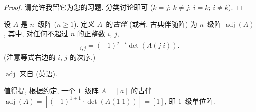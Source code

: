 \documentclass[../libro.tex]{subfiles}
\begin{document}
\begin{proof}
    请允许我留它为您的习题.
    分类讨论即可
    (\(k = j\); %
    \(k \neq j\);
    \(i = k\);
    \(i \neq k\)). %
\end{proof}

\begin{definition}[古伴]
    设 \(A\) 是 \(n\)~级阵 (\(n \geq 1\)).
    定义 \(A\)~的\emph{古伴}
    (或者, 古典伴随阵)
    为 \(n\)~级阵 \(\operatorname{adj} {(A)}\),
    其中, 对任何不超过 \(n\) 的正整数 \(i\), \(j\),
    \begin{align*}
        [\operatorname{adj} {(A)}]_{i,j}
        = (-1)^{j+i} \det {(A(j|i))}.
    \end{align*}
    (注意等式右边的 \(i\), \(j\) 的次序.)
\end{definition}

\(\operatorname{adj}\) 来自  (英语).

值得提,
根据约定,
一个 \(1\)~级阵 \(A = [a]\) 的古伴
\(\operatorname{adj} {(A)} =
[(-1)^{1+1} \allowbreak \cdot \det {(A(1|1))}] = [1]\),
即 \(1\)~级单位阵.
\end{document}
